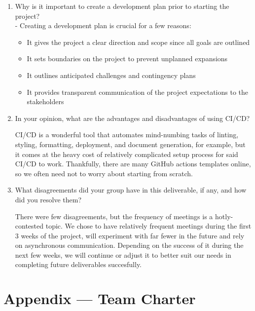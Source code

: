\documentclass{article}
\begin{document}
\begin{enumerate}
    \item Why is it important to create a development plan prior to starting the
    project?\\
    - Creating a development plan is crucial for a few reasons:
    \begin{itemize}
      \item It gives the project a clear direction and scope since all goals are outlined
      \item It sets boundaries on the project to prevent unplanned expansions
      \item It outlines anticipated challenges and contingency plans
      \item It provides transparent communication of the project expectations to the stakeholders
    \end{itemize}
    \item In your opinion, what are the advantages and disadvantages of using CI/CD?
    
    CI/CD is a wonderful tool that automates mind-numbing tasks of linting, styling, formatting, deployment, and document generation, for example, but it comes at the heavy cost of relatively complicated setup process for said CI/CD to work. Thankfully, there are many GitHub actions templates online, so we often need not to worry about starting from scratch.
    \item What disagreements did your group have in this deliverable, if any, and how did you resolve them?
    
    There were few disagreements, but the frequency of meetings is a hotly-contested topic. We chose to have relatively frequent meetings during the first 3 weeks of the project, will experiment with far fewer in the future and rely on asynchronous communication. Depending on the success of it during the next few weeks, we will continue or adjust it to better suit our needs in completing future deliverables succesfully.
\end{enumerate}

\newpage{}

\section*{Appendix --- Team Charter}

\end{document}
